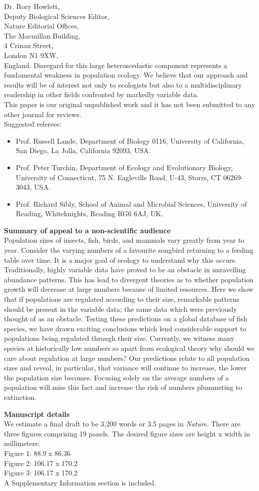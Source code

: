 \documentclass[a4paper,12pt]{letter}
\begin{document}
\begin{letter}{Dr. Rory Howlett,\\Deputy Biological Sciences Editor,\\
Nature Editorial Offices,\\The Macmillan Building,\\ 4 Crinan Street, \\ London N1 9XW,  \\ England.}
Disregard for this large heteroscedastic component represents a fundamental weakness in population ecology. We believe 
that our approach and results will be of interest not only to ecologists but also to a multidisciplinary readership in other fields confronted by markedly variable data.\\
This paper is our original unpublished work and it has not been submitted to any other journal for reviews.\\
Suggested referees:
\begin{itemize}
\item{Prof. Russell Lande, Department of Biology 0116, University of California, San Diego, La Jolla, California 92093, USA.}
\item{Prof. Peter Turchin, Department of Ecology and Evolutionary Biology, University of Connecticut,
75 N. Eagleville Road, U-43, Storrs, CT 06269-3043, USA.}
\item{Prof. Richard Sibly, School of Animal and Microbial Sciences, University of Reading, Whiteknights, Reading RG6 6AJ, UK.}
\end{itemize}
{\bf Summary of appeal to  a non-scientific audience}\\
Population sizes of insects, fish, birds, and mammals vary greatly from year to year. Consider the varying numbers of a favourite songbird returning to a feeding table over time. It is a major goal of ecology to understand why this occurs. Traditionally, highly variable data have proved to be an obstacle in unravelling abundance patterns. This has lead to divergent theories as to whether population growth will decrease at large numbers because of limited resources. Here we show that if populations are regulated according to their size, remarkable patterns should be present in the variable data; the same data which were previously thought of as an obstacle. Testing these predictions on a global database of fish species, we have drawn exciting conclusions which  lend considerable support to populations being regulated through their size. Currently, we witness many species at historically low numbers so apart from ecological theory why should we care about regulation at large numbers? Our predictions relate to all population sizes and reveal, in particular, that variance will continue to increase, the lower the population size becomes. Focusing solely on the average numbers of a population will miss this fact and increase the risk of numbers plummeting to extinction.

{\bf Manuscript details}\\
We estimate a final draft to be 3,200 words or 3.5 pages in \textit{Nature}. There are three figures comprising 19 panels. The desired figure sizes are height x width in millimeters:\\
Figure 1: 88.9 x 86.36\\
Figure 2: 106.17 x 170.2\\
Figure 3: 106.17 x 170.2\\
A Supplementary Information section is included.


\end{letter}
\end{document}
